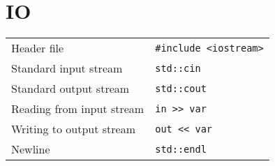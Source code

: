 \chapter{IO}

\begin{center}
  \begin{tabular}{ll}
    Header file & \verb'#include <iostream>' \\
    Standard input stream & \lstinline{std::cin} \\
    Standard output stream & \lstinline{std::cout} \\
    Reading from input stream & \lstinline{in >> var} \\
    Writing to output stream & \lstinline{out << var} \\
    Newline & \lstinline{std::endl} \\
  \end{tabular}
\end{center}

\begin{example}
\end{example}

\begin{example}
\end{example}



